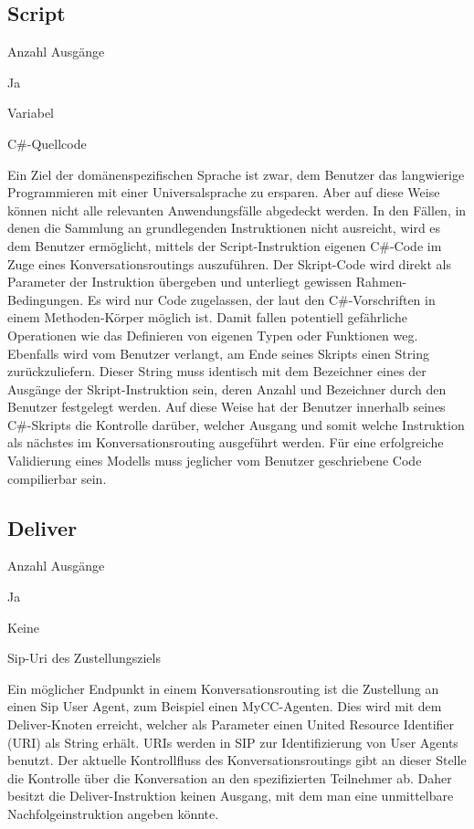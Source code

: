 \subsection{Script}
\label{subsec:Script}
\begin{labeling}{Anzahl Ausgänge}
\item [Eingang] Ja
\item [Anzahl Ausgänge] Variabel
\item [Parameter] C\#-Quellcode
\item [Beschreibung] Ein Ziel der domänenspezifischen Sprache ist zwar, dem Benutzer das langwierige Programmieren mit einer Universalsprache zu ersparen. Aber auf diese Weise können nicht alle relevanten Anwendungsfälle abgedeckt werden. In den Fällen, in denen die Sammlung an grundlegenden Instruktionen nicht ausreicht, wird es dem Benutzer ermöglicht, mittels der Script-Instruktion eigenen C\#-Code im Zuge eines Konversationsroutings auszuführen. Der Skript-Code wird direkt als Parameter der Instruktion übergeben und unterliegt gewissen Rahmen-Bedingungen. Es wird nur Code zugelassen, der laut den C\#-Vorschriften in einem Methoden-Körper möglich ist. Damit fallen potentiell gefährliche Operationen wie das Definieren von eigenen Typen oder Funktionen weg. Ebenfalls wird vom Benutzer verlangt, am Ende seines Skripts einen String zurückzuliefern. Dieser String muss identisch mit dem Bezeichner eines der Ausgänge der Skript-Instruktion sein, deren Anzahl und Bezeichner durch den Benutzer festgelegt werden. Auf diese Weise hat der Benutzer innerhalb seines C\#-Skripts die Kontrolle darüber, welcher Ausgang und somit welche Instruktion als nächstes im Konversationsrouting ausgeführt werden. Für eine erfolgreiche Validierung eines Modells muss jeglicher vom Benutzer geschriebene Code compilierbar sein.   
\end{labeling}

\subsection{Deliver}
\label{subsec:Deliver}
\begin{labeling}{Anzahl Ausgänge}
\item [Eingang] Ja
\item [Anzahl Ausgänge] Keine
\item [Parameter] Sip-Uri des Zustellungsziels
\item [Beschreibung] Ein möglicher Endpunkt in einem Konversationsrouting ist die Zustellung an einen Sip User Agent, zum Beispiel einen MyCC-Agenten. Dies wird mit dem Deliver-Knoten erreicht, welcher als Parameter einen United Resource Identifier (URI) als String erhält. URIs werden in SIP zur Identifizierung von User Agents benutzt. Der aktuelle Kontrollfluss des Konversationsroutings gibt an dieser Stelle die Kontrolle über die Konversation an den spezifizierten Teilnehmer ab. Daher besitzt die Deliver-Instruktion keinen Ausgang, mit dem man eine unmittelbare Nachfolgeinstruktion angeben könnte.
\end{labeling}

